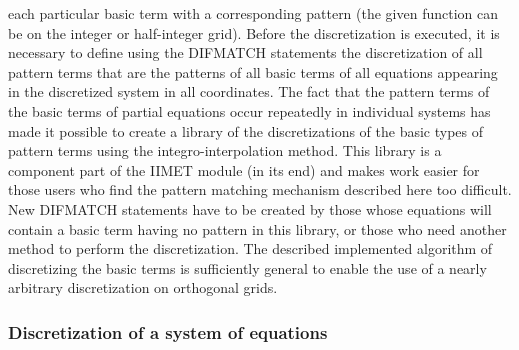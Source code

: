 each particular basic  term  with  a  corresponding  pattern  (the given
function can be on the integer or half-integer grid).
     Before the  discretization is  executed, it  is necessary to define
using the DIFMATCH statements  the discretization  of all  pattern terms
that are  the patterns  of all basic terms of all equations appearing in
the discretized  system in  all coordinates.  The fact  that the pattern
terms  of  the  basic  terms  of  partial  equations occur repeatedly in
individual systems has made it  possible  to  create  a  library  of the
discretizations  of   the  basic   types  of  pattern  terms  using  the
integro-interpolation method. This library  is a  component part  of the
IIMET module (in its end) and makes work easier for those users who find
the  pattern  matching  mechanism  described  here  too  difficult.  New
DIFMATCH statements  have to  be created  by those  whose equations will
contain a basic term  having no  pattern in  this library,  or those who
need  another  method  to  perform  the  discretization.  The  described
implemented algorithm  of discretizing  the basic  terms is sufficiently
general  to  enable  the  use  of  a  nearly arbitrary discretization on
orthogonal grids.


\subsubsection{Discretization of a system of equations}


